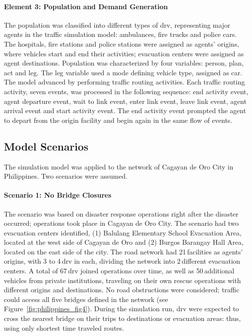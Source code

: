 \paragraph{Element 3: Population and Demand Generation}
The population was classified into different types of \gls{drv}, representing major agents in the traffic simulation model: ambulances, fire trucks and police cars.  The hospitals, fire stations and police stations were assigned as agents' origins, where vehicles start and end their activities; evacuation centers were assigned as agent destinations. Population was characterized by four variables: person, plan, act and leg. The leg variable used a mode defining vehicle type, assigned as car. The model advanced by performing traffic routing activities. Each traffic routing activity, seven events, was processed in the following sequence: end activity event, agent departure event, wait to link event, enter link event, leave link event, agent arrival event and start activity event. The end activity event prompted the agent to depart from the origin facility and begin again in the same flow of events. 

\subsection{Model Scenarios} 
The simulation model was applied to the network of Cagayan de Oro City in Philippines. Two scenarios were assumed.

\paragraph{Scenario 1: No Bridge Closures}
The scenario was based on disaster response operations right after the disaster occurred; operations took place in Cagayan de Oro City. The scenario had two evacuation centers identified, (1) Balulang Elementary School Evacuation Area, located at the west side of Cagayan de Oro and (2) Burgos Barangay Hall Area, located on the east side of the city. The road network had 21\,facilities as agents' origins, with 3 to 4\,\gls{drv} in each, dividing the network into 2\,different evacuation centers. A total of 67\,\gls{drv} joined operations over time, as well as 50\,additional vehicles from private institutions, traveling on their own rescue operations with different origins and destinations. No road obstructions were considered; traffic could access all five bridges defined in the network (see Figure~\ref{fig:philippines_fig4}). During the simulation run, \gls{drv} were expected to cross the nearest bridge on their trips to destinations or evacuation areas: thus, using only shortest time traveled routes.

